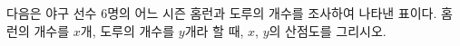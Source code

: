 다음은 야구 선수 $6$명의 어느 시즌 홈런과 도루의 개수를 조사하여 나타낸 표이다. 홈런의 개수를 $x$개, 도루의 개수를 $y$개라 할 때, $x$, $y$의 산점도를 그리시오.
\par\smallskip\begin{center}\resizebox{\ifdim\width>\linewidth\linewidth\else\width\fi}{!}{}\end{center}
